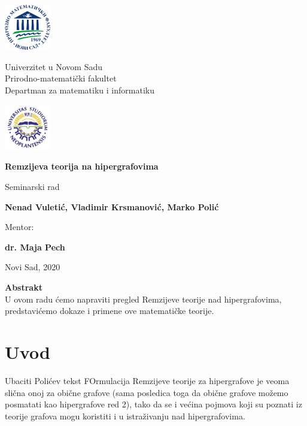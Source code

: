\documentclass[a4paper]{article}
\newcommand{\autor}{ \centering Nenad Vuletić, Vladimir Krsmanović, Marko Polić}
\newcommand{\naslov}{Remzijeva teorija na hipergrafovima}
\newcommand{\datum}{Novi Sad, 2020}
\newcommand{\mentor}{dr. Maja Pech}
\begin{document}
	\begin{center}
		
		\includegraphics[width=2cm]{grbPMF}\hfill
		\parbox[b]{45ex}{\centering 
			Univerzitet u Novom Sadu\\
			Prirodno-matematički fakultet\\
			Departman za matematiku i informatiku}\hfill 
		\includegraphics[width=2cm]{grbUNS}
		
		\vspace{22ex}
				
		{\Huge {\bf \setlength{\baselineskip}{1.5\baselineskip}\naslov}}
		
		\vspace{4ex}
		Seminarski rad
		
		\vspace{12ex}
		\parbox[b]{\textwidth}{{\Large {\bf \hspace{1cm}\autor}}}
		\vspace{10ex}
		
		{\Large Mentor:}
		
		{\Large  \textbf{\mentor}}
		
		\vfill
		
		\datum
		
	\end{center}
	\thispagestyle{empty}
	\newpage	
	\vfill
	\begin{center}
		\textbf{Abstrakt}\\
		U ovom radu ćemo napraviti pregled Remzijeve teorije nad hipergrafovima, predstavićemo dokaze i primene ove matematičke teorije.
		\thispagestyle{empty}
	\end{center}
	\pagebreak
	\tableofcontents
	\newpage
	\section{Uvod}
	Ubaciti Polićev tekst
	FOrmulacija Remzijeve teorije za hipergrafove je veoma slična onoj za obične grafove (sama posledica toga da obične grafove možemo posmatati kao hipergrafove red 2), tako da se i većina pojmova koji su poznati iz teorije grafova mogu koristiti i u istraživanju nad hipergrafovima.
	\pagebreak
\end{document}
